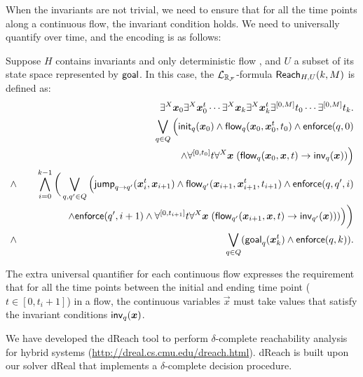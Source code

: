 When the invariants are not trivial, we need to ensure that for all the time points along a continuous flow, the invariant condition holds. We need to universally quantify over time, and the encoding is as follows:
\begin{definition}\label{br2}
Suppose $H$ contains invariants and only deterministic flow
, and $U$ a subset of its state space represented by $\mathsf{goal}$. In this case, the $\mathcal{L}_{\mathbb{R}_{\mathcal{F}}}$-formula $\mathsf{Reach}_{H,U}(k,M)$ is defined as:
\begin{eqnarray*}
& &\exists^X \vec x_{0} \exists^X\vec x_{0}^t\cdots \exists^X \vec x_{k}\exists^X\vec x_{k}^t \exists^{[0,M]}t_0\cdots \exists^{[0,M]}t_k.\\
& &\bigvee_{q\in Q} \Big(\init_{q}(\vec x_{0})\wedge \flow_{q}(\vec x_{0}, \vec x_{0}^t, t_0)\wedge \enforce(q,0)\\
& &\hspace{5cm} \wedge \forall^{[0,t_0]}t\forall^X\vec x\;(\flow_{q}(\vec x_{0}, \vec x, t)\rightarrow \inv_{q}(\vec x))\Big) \\
\wedge & &\bigwedge_{i=0}^{k-1}\bigg( \bigvee_{q, q'\in Q} \Big(\jump_{q\rightarrow q'}(\vec
x_{i}^t, \vec x_{i+1})\wedge \flow_{q'}(\vec x_{i+1}, \vec x_{i+1}^t, t_{i+1})\wedge \enforce(q,q',i)\\
& & \hspace{1.5cm}\wedge\enforce(q',i+1)\wedge \forall^{[0,t_{i+1}]}t\forall^X\vec x\;(\flow_{q'}(\vec x_{i+1}, \vec x,
t)\rightarrow \inv_{q'}(\vec x)) )\Big)\bigg)\\
\wedge & &\bigvee_{q\in Q} (\goal_q(\vec x_{k}^t)\wedge \enforce(q,k)).
\end{eqnarray*}
\end{definition}
The extra universal quantifier for each continuous flow expresses the requirement that for all the time points between the initial and ending time point ($t\in[0,t_i+1]$) in a flow, the continuous variables $\vec x$ must take values that satisfy the invariant conditions $\inv_q(\vec x)$.

We have developed the dReach tool to perform $\delta$-complete reachability analysis for 
hybrid systems (\url{http://dreal.cs.cmu.edu/dreach.html}). dReach is built upon our solver dReal \citep{dreal} that implements a $\delta$-complete decision procedure.
